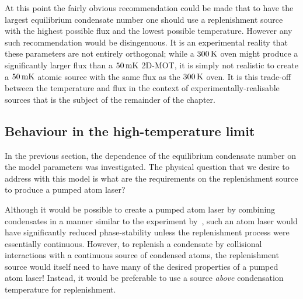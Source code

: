 At this point the fairly obvious recommendation could be made that to have the largest equilibrium condensate number one should use a replenishment source with the highest possible flux and the lowest possible temperature.  However any such recommendation would be disingenuous.  It is an experimental reality that these parameters are not entirely orthogonal; while a $\unit[300]{K}$ oven might produce a significantly larger flux than a $\unit[50]{mK}$ 2D-MOT, it is simply not realistic to create a $\unit[50]{mK}$ atomic source with the same flux as the $\unit[300]{K}$ oven.  It is this trade-off between the temperature and flux in the context of experimentally-realisable sources that is the subject of the remainder of the chapter.




\subsection{Behaviour in the high-temperature limit}
In the previous section, the dependence of the equilibrium condensate number on the model parameters was investigated. The physical question that we desire to address with this model is what are the requirements on the replenishment source to produce a pumped atom laser?

Although it would be possible to create a pumped atom laser by combining condensates in a manner similar to the experiment by~\citet{Chikkatur:2002qa}, such an atom laser would have significantly reduced phase-stability unless the replenishment process were essentially continuous. However, to replenish a condensate by collisional interactions with a continuous source of condensed atoms, the replenishment source would itself need to have many of the desired properties of a pumped atom laser! Instead, it would be preferable to use a source \emph{above} condensation temperature for replenishment.

